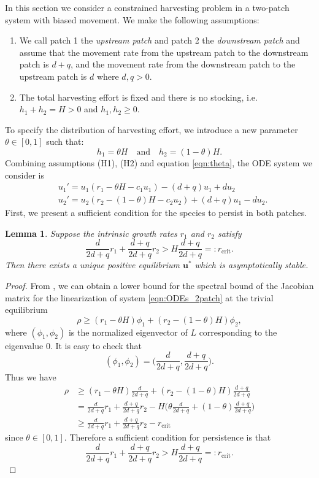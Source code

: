 \documentclass[11pt]{article}
\newtheorem{lemma}[theorem]{Lemma}
\theoremstyle{definition}
\begin{document}
In this section we consider a constrained harvesting problem in a two-patch system with biased movement. We make the following assumptions:
\begin{enumerate}
    
    \item [(H1)] We call patch 1 the \textit{upstream patch} and patch 2 the \textit{downstream patch} and assume that the movement rate from the upstream patch to the downstream patch is $d+q$, and the movement rate from the downstream patch to the upstream patch is $d$ where $d, q>0$.
    \item [(H2)] The total harvesting effort is fixed and there is no stocking, i.e. $h_1+h_2=H>0$ and $h_1,h_2\geq 0$.
\end{enumerate}
To specify the distribution of harvesting effort, we introduce a new parameter $\theta\in[0,1]$ such that:
\begin{equation}\label{eqn:theta}
h_1=\theta H \quad \text{and} \quad h_2=(1-\theta)H.
\end{equation}
Combining assumptions (H1), (H2) and equation \eqref{eqn:theta}, the ODE system we consider is
\begin{align}\label{eqn:ODEs_2patch}
    &u_1'=u_1(r_1-\theta H -c_1u_1) -(d+q)u_1+du_2\nonumber\\
    &u_2'=u_2(r_2-(1-\theta)H -c_2u_2)+(d+q)u_1-du_2.
\end{align}
First, we present a sufficient condition for the species to persist in both patches.
\begin{lemma}\label{lem:persist}
    Suppose the intrinsic growth rates $r_1$ and $r_2$ satisfy
    \[
    \frac{d}{2d+q}r_1+\frac{d+q}{2d+q}r_2>H\frac{d+q}{2d+q} =: r_{\text{crit}}.
    \]
    Then there exists a unique  positive equilibrium $\bm u^*$ which is asymptotically stable.
\end{lemma}
\begin{proof}
    From \cite{chen2022two}, we can obtain a lower bound for the spectral bound of the Jacobian matrix for the linearization of  system \eqref{eqn:ODEs_2patch} at the trivial equilibrium
    \[
    \rho \geq (r_1-\theta H)\phi_1 + (r_2-(1-\theta)H)\phi_2,
    \]
    where $(\phi_1,\phi_2)$ is the normalized eigenvector of $L$ corresponding to the eigenvalue $0$. It is easy to check that 
    \[
    (\phi_1,\phi_2)=\bigg(\frac{d}{2d+q},\frac{d+q}{2d+q}\bigg).
    \]
    Thus we have 
    \begin{align*}
    \rho &\geq (r_1-\theta H)\frac{d}{2d+q} + (r_2-(1-\theta)H)\frac{d+q}{2d+q} \\
    &= \frac{d}{2d+q}r_1+\frac{d+q}{2d+q}r_2 - H\bigg(\theta\frac{d}{2d+q}+(1-\theta)\frac{d+q}{2d+q}\bigg)\\
    &\geq \frac{d}{2d+q}r_1+\frac{d+q}{2d+q}r_2-r_{\text{crit}}
    \end{align*}
    since $\theta\in[0,1]$. Therefore a sufficient condition for persistence is that 
     \[
    \frac{d}{2d+q}r_1+\frac{d+q}{2d+q}r_2>H\frac{d+q}{2d+q} =: r_{\text{crit}}.
    \]
\end{proof}
\end{document}
